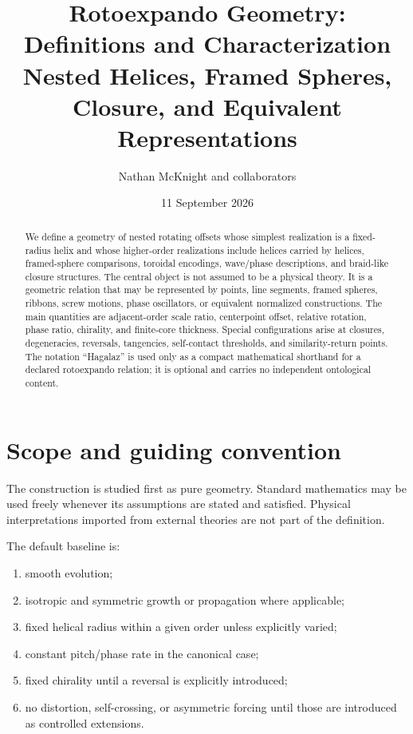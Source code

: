 \documentclass[11pt]{article}
\title{Rotoexpando Geometry: Definitions and Characterization\\
\large Nested Helices, Framed Spheres, Closure, and Equivalent Representations}
\author{Nathan McKnight and collaborators}
\date{11 September 2026}
\begin{document}
\maketitle

\begin{abstract}
We define a geometry of nested rotating offsets whose simplest realization is a
fixed-radius helix and whose higher-order realizations include helices carried by
helices, framed-sphere comparisons, toroidal encodings, wave/phase descriptions,
and braid-like closure structures.  The central object is not assumed to be a
physical theory.  It is a geometric relation that may be represented by points,
line segments, framed spheres, ribbons, screw motions, phase oscillators, or
equivalent normalized constructions.  The main quantities are adjacent-order
scale ratio, centerpoint offset, relative rotation, phase ratio, chirality, and
finite-core thickness.  Special configurations arise at closures, degeneracies,
reversals, tangencies, self-contact thresholds, and similarity-return points.
The notation ``Hagalaz'' is used only as a compact mathematical shorthand for a
declared rotoexpando relation; it is optional and carries no independent
ontological content.
\end{abstract}

\section{Scope and guiding convention}

The construction is studied first as pure geometry.  Standard mathematics may be
used freely whenever its assumptions are stated and satisfied.  Physical
interpretations imported from external theories are not part of the definition.

The default baseline is:
\begin{enumerate}[label=(\roman*)]
    \item smooth evolution;
    \item isotropic and symmetric growth or propagation where applicable;
    \item fixed helical radius within a given order unless explicitly varied;
    \item constant pitch/phase rate in the canonical case;
    \item fixed chirality until a reversal is explicitly introduced;
    \item no distortion, self-crossing, or asymmetric forcing until those are
          introduced as controlled extensions.
\end{enumerate}
\end{document}

